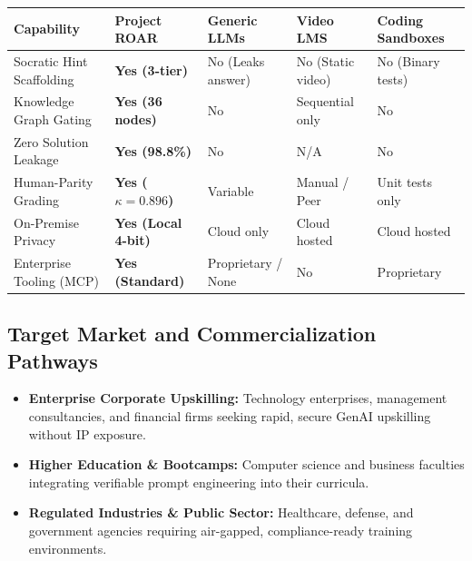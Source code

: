 \documentclass[11pt,a4paper]{article}
\begin{document}
\vspace{1pt}
\begin{table}[htbp]
  \centering
  \footnotesize
  \label{tab:competition}
  \vspace{2pt}
  \begin{tabularx}{\textwidth}{@{}p{3.6cm}>{\centering\arraybackslash}X>{\centering\arraybackslash}X>{\centering\arraybackslash}X>{\centering\arraybackslash}X@{}}
    \toprule
    \textbf{Capability} & \textbf{Project ROAR} & \textbf{Generic LLMs} & \textbf{Video LMS} & \textbf{Coding Sandboxes} \\
    \midrule
    Socratic Hint Scaffolding & \textbf{Yes (3-tier)} & No (Leaks answer) & No (Static video) & No (Binary tests) \\
    Knowledge Graph Gating & \textbf{Yes (36 nodes)} & No & Sequential only & No \\
    Zero Solution Leakage & \textbf{Yes (98.8\%)} & No & N/A & No \\
    Human-Parity Grading & \textbf{Yes ($\kappa = 0.896$)} & Variable & Manual / Peer & Unit tests only \\
    On-Premise Privacy & \textbf{Yes (Local 4-bit)} & Cloud only & Cloud hosted & Cloud hosted \\
    Enterprise Tooling (MCP) & \textbf{Yes (Standard)} & Proprietary / None & No & Proprietary \\
    \bottomrule
  \end{tabularx}
\end{table}

\vspace{-4pt}

\subsection{Target Market and Commercialization Pathways}
\begin{itemize}[leftmargin=1.4em, itemsep=1.5pt]
  \item \textbf{Enterprise Corporate Upskilling:} Technology enterprises, management consultancies, and financial firms seeking rapid, secure GenAI upskilling without IP exposure.
  \item \textbf{Higher Education \& Bootcamps:} Computer science and business faculties integrating verifiable prompt engineering into their curricula.
  \item \textbf{Regulated Industries \& Public Sector:} Healthcare, defense, and government agencies requiring air-gapped, compliance-ready training environments.
\end{itemize}
\end{document}
